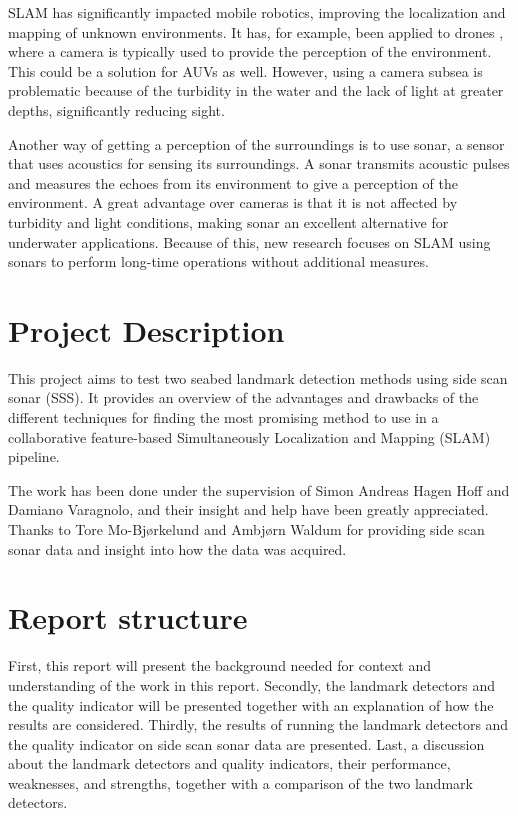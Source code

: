 SLAM has significantly impacted mobile robotics, improving the localization and mapping of unknown environments. It has, for example, been applied to drones \cite{VonStumberg2017FromExploration}, where a camera is typically used to provide the perception of the environment. \cite{Hidalgo2015ReviewTechniques}This could be a solution for AUVs as well. However, using a camera subsea is problematic because of the turbidity in the water and the lack of light at greater depths, significantly reducing sight. 

Another way of getting a perception of the surroundings is to use sonar, a sensor that uses acoustics for sensing its surroundings. A sonar transmits acoustic pulses and measures the echoes from its environment to give a perception of the environment. A great advantage over cameras is that it is not affected by turbidity and light conditions, making sonar an excellent alternative for underwater applications. Because of this, new research focuses on SLAM using sonars to perform long-time operations without additional measures.

\section{Project Description}

This project aims to test two seabed landmark detection methods using side scan sonar (SSS). It provides an overview of the advantages and drawbacks of the different techniques for finding the most promising method to use in a collaborative feature-based Simultaneously Localization and Mapping (SLAM) pipeline.

The work has been done under the supervision of Simon Andreas Hagen Hoff and Damiano Varagnolo, and their insight and help have been greatly appreciated. Thanks to Tore Mo-Bjørkelund and Ambjørn Waldum for providing side scan sonar data and insight into how the data was acquired. 


\section{Report structure}

First, this report will present the background needed for context and understanding of the work in this report. Secondly, the landmark detectors and the quality indicator will be presented together with an explanation of how the results are considered. Thirdly, the results of running the landmark detectors and the quality indicator on side scan sonar data are presented. Last, a discussion about the landmark detectors and quality indicators, their performance, weaknesses, and strengths, together with a comparison of the two landmark detectors.  


